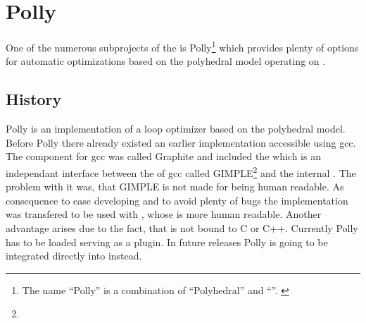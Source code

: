 \chapter{Polly}
One of the numerous subprojects of the \llvm is Polly\footnote{The name \enquote{Polly} is a combination of \enquote{Polyhedral} and \enquote{\llvm}. \cite{PollyGrosser}} which provides plenty of options for automatic optimizations based on the polyhedral model operating on \llvmir.

\section{History}
Polly is an implementation of a loop optimizer based on the polyhedral model.\\
Before Polly there already existed an earlier implementation accessible using gcc.
The component for gcc was called Graphite and included the \pcp which is an independant interface between the \ir of gcc called GIMPLE\footnote{} and the internal \ir \gpoly.
The problem with it was, that GIMPLE is not made for being human readable.
As consequence to ease developing and to avoid plenty of bugs the implementation was transfered to be used with \llvm, whose \ir is more human readable.
Another advantage arises due to the fact, that \llvm is not bound to C or C++.
Currently Polly has to be loaded serving as a \llvm plugin.
In future releases Polly is going to be integrated directly into \llvm instead.

